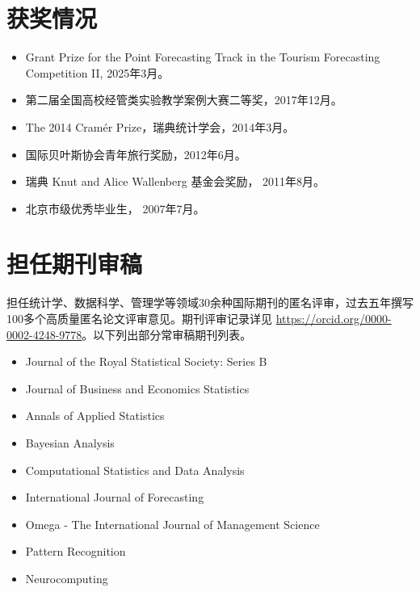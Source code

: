 \documentclass[twoside,a4paper,11pt]{article}
\begin{document}
\section{获奖情况}
\begin{itemize}

\item Grant Prize for the Point Forecasting Track in the Tourism Forecasting Competition II, 2025年3月。
\item 第二届全国高校经管类实验教学案例大赛二等奖，2017年12月。
\item The 2014 Cramér Prize，瑞典统计学会，2014年3月。

\item 国际贝叶斯协会青年旅行奖励，2012年6月。

\item 瑞典 Knut and Alice Wallenberg 基金会奖励， 2011年8月。

\item 北京市级优秀毕业生， 2007年7月。
\end{itemize}

\section{担任期刊审稿}
担任统计学、数据科学、管理学等领域30余种国际期刊的匿名评审，过去五年撰写100多个高质量匿名论文评审意见。期刊评审记录详见 \url{https://orcid.org/0000-0002-4248-9778}。以下列出部分常审稿期刊列表。

\begin{itemize}
\item Journal of the Royal Statistical Society: Series B
\item Journal of Business and Economics Statistics
\item Annals of Applied Statistics
\item Bayesian Analysis
\item Computational Statistics and Data Analysis
\item International Journal of Forecasting
\item Omega - The International Journal of Management Science
\item Pattern Recognition
\item Neurocomputing
\end{itemize}
\end{document}
